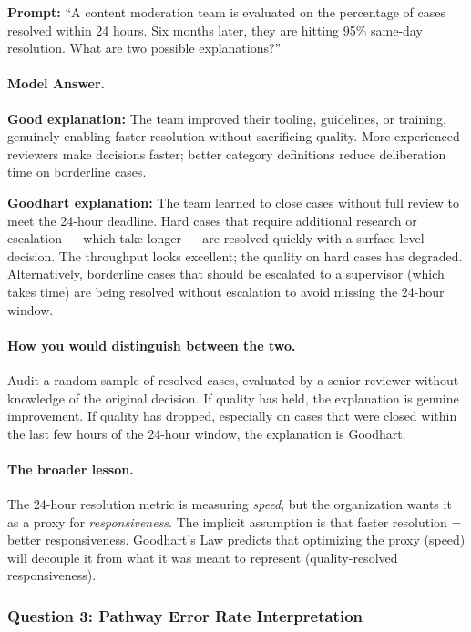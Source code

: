 \textbf{Prompt:} ``A content moderation team is evaluated on the percentage of cases resolved within 24 hours. Six months later, they are hitting 95\% same-day resolution. What are two possible explanations?''

\paragraph{Model Answer.}

\textbf{Good explanation:} The team improved their tooling, guidelines, or training, genuinely enabling faster resolution without sacrificing quality. More experienced reviewers make decisions faster; better category definitions reduce deliberation time on borderline cases.

\textbf{Goodhart explanation:} The team learned to close cases without full review to meet the 24-hour deadline. Hard cases that require additional research or escalation --- which take longer --- are resolved quickly with a surface-level decision. The throughput looks excellent; the quality on hard cases has degraded. Alternatively, borderline cases that should be escalated to a supervisor (which takes time) are being resolved without escalation to avoid missing the 24-hour window.

\paragraph{How you would distinguish between the two.}

Audit a random sample of resolved cases, evaluated by a senior reviewer without knowledge of the original decision. If quality has held, the explanation is genuine improvement. If quality has dropped, especially on cases that were closed within the last few hours of the 24-hour window, the explanation is Goodhart.

\paragraph{The broader lesson.}

The 24-hour resolution metric is measuring \emph{speed}, but the organization wants it as a proxy for \emph{responsiveness}. The implicit assumption is that faster resolution = better responsiveness. Goodhart's Law predicts that optimizing the proxy (speed) will decouple it from what it was meant to represent (quality-resolved responsiveness).

\subsubsection{Question 3: Pathway Error Rate Interpretation}

